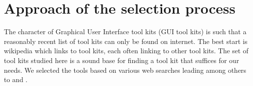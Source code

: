 \section{Approach of the selection process}

The character of Graphical User Interface tool kits (GUI tool kits) is such that
a reasonably recent list of tool kits can only be found on internet. The best
start is wikipedia which links to tool kits, each often linking to other
tool kits. The set of tool kits studied here is a sound base for finding a
tool kit that suffices for our needs. We selected the tools based on various web
searches leading among others to \cite{wiki:xplatf} and \cite{wiki:xplatf_gui}.  
